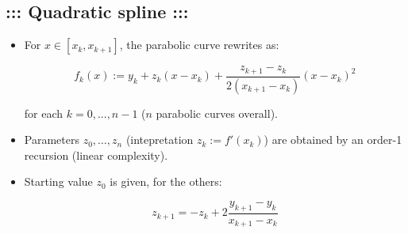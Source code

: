 \documentclass[a4paper,12pt]{amsart}
\newif\ifita
\begin{document}
\subsection*{\bf ::: \ifita Spline quadratica \else Quadratic spline \fi :::}
\begin{itemize}
\ifita
\item Per $x\in[x_k,x_{k+1}]$, ho la parabola:
\else
\item For $x\in[x_k,x_{k+1}]$, the parabolic curve rewrites as:
\fi
$$f_k(x):= y_k+z_k(x-x_k)+\frac{z_{k+1}-z_k}{2(x_{k+1}-x_k)} (x-x_k)^2$$
\ifita
per ogni $k=0,...,n-1$ (complessivamente $n$ parabole).
\else
for each $k=0,...,n-1$ ($n$ parabolic curves overall).
\fi
\ifita
\item I parametri $z_0,\ldots,z_n$ (intepretazione $z_k:=f'(x_k)$) si ricavano con ricorsione di ordine uno (complessit\`a lineare).
\else
\item Parameters $z_0,\ldots,z_n$ (intepretation $z_k:=f'(x_k)$) are obtained by an order-1 recursion  (linear complexity).
\fi
\ifita
\item Il valore iniziale di $z_0$ \`e assegnato, per gli altri:
\else
\item Starting value $z_0$ is given, for the others:
\fi
$$z_{k+1} = -z_k + 2 \frac{y_{k+1}-y_k}{x_{k+1}-x_k}$$
\end{itemize}
\end{document}
